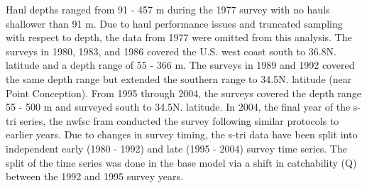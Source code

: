 \documentclass[11pt,
  english,
  a4paper,
]{article}
\begin{document}
\leavevmode\tagmcend\tagstructend\par


Haul depths ranged from 91 - 457 m during the 1977 survey with no hauls shallower than 91 m. Due to haul performance issues and truncated sampling with respect to depth, the data from 1977 were omitted from this analysis. The surveys in 1980, 1983, and 1986 covered the U.S. west coast south to 36.8\textdegree N. latitude and a depth range of 55 - 366 m. The surveys in 1989 and 1992 covered the same depth range but extended the southern range to 34.5\textdegree N. latitude (near Point Conception). From 1995 through 2004, the surveys covered the depth range 55 - 500 m and surveyed south to 34.5\textdegree N. latitude. In 2004, the final year of the \gls{s-tri} series, the \gls{nwfsc} \gls{fram} conducted the survey following similar protocols to earlier years. Due to changes in survey timing, the \gls{s-tri} data have been split into independent early (1980 - 1992) and late (1995 - 2004) survey time series. The split of the time series was done in the base model via a shift in catchability (Q) between the 1992 and 1995 survey years.

\leavevmode\tagmcend\tagstructend\par

\end{document}
